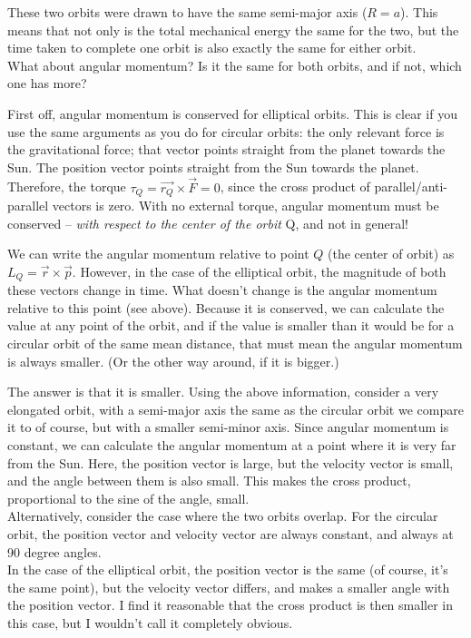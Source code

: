 These two orbits were drawn to have the same semi-major axis ($R = a$). This means that not only is the total mechanical energy the same for the two, but the time taken to complete one orbit is also exactly the same for either orbit.\\
What about angular momentum? Is it the same for both orbits, and if not, which one has more?

First off, angular momentum is conserved for elliptical orbits. This is clear if you use the same arguments as you do for circular orbits: the only relevant force is the gravitational force; that vector points straight from the planet towards the Sun. The position vector points straight from the Sun towards the planet. Therefore, the torque $\tau_Q = \vec{r_Q} \times \vec{F} = 0$, since the cross product of parallel/anti-parallel vectors is zero. With no external torque, angular momentum must be conserved -- \emph{with respect to the center of the orbit} Q, and not in general!

We can write the angular momentum relative to point $Q$ (the center of orbit) as $L_Q = \vec{r} \times \vec{p}$. However, in the case of the elliptical orbit, the magnitude of both these vectors change in time.  What doesn't change is the angular momentum relative to this point (see above). Because it is conserved, we can calculate the value at any point of the orbit, and if the value is smaller than it would be for a circular orbit of the same mean distance, that must mean the angular momentum is always smaller. (Or the other way around, if it is bigger.)

The answer is that it is smaller. Using the above information, consider a very elongated orbit, with a semi-major axis the same as the circular orbit we compare it to of course, but with a smaller semi-minor axis. Since angular momentum is constant, we can calculate the angular momentum at a point where it is very far from the Sun. Here, the position vector is large, but the velocity vector is small, and the angle between them is also small. This makes the cross product, proportional to the sine of the angle, small.\\
Alternatively, consider the case where the two orbits overlap. For the circular orbit, the position vector and velocity vector are always constant, and always at 90 degree angles.\\
In the case of the elliptical orbit, the position vector is the same (of course, it's the same point), but the velocity vector differs, and makes a smaller angle with the position vector. I find it reasonable that the cross product is then smaller in this case, but I wouldn't call it completely obvious.

